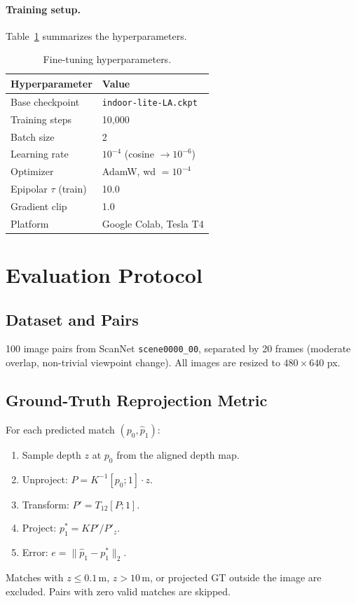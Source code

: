 \documentclass[10pt]{article}
\begin{document}
\paragraph{Training setup.} Table~\ref{tab:training} summarizes the hyperparameters.

\begin{table}[H]
\centering
\caption{Fine-tuning hyperparameters.}
\label{tab:training}
\small
\begin{tabular}{ll}
\toprule
\textbf{Hyperparameter} & \textbf{Value} \\
\midrule
Base checkpoint         & \texttt{indoor-lite-LA.ckpt} \\
Training steps          & 10,000 \\
Batch size              & 2 \\
Learning rate           & $10^{-4}$ (cosine $\to 10^{-6}$) \\
Optimizer               & AdamW, wd $= 10^{-4}$ \\
Epipolar $\tau$ (train) & 10.0 \\
Gradient clip           & 1.0 \\
Platform                & Google Colab, Tesla T4 \\
\bottomrule
\end{tabular}
\end{table}

\section{Evaluation Protocol}

\subsection{Dataset and Pairs}
100 image pairs from ScanNet \texttt{scene0000\_00}, separated by 20 frames (moderate overlap, non-trivial viewpoint change). All images are resized to $480 \times 640$ px.

\subsection{Ground-Truth Reprojection Metric}

For each predicted match $(p_0, \hat{p}_1)$:
\begin{enumerate}[leftmargin=*,itemsep=1pt]
    \item Sample depth $z$ at $p_0$ from the aligned depth map.
    \item Unproject: $P = K^{-1}[p_0; 1] \cdot z$.
    \item Transform: $P' = T_{12}[P; 1]$.
    \item Project: $p_1^* = K P' / P'_z$.
    \item Error: $e = \|\hat{p}_1 - p_1^*\|_2$.
\end{enumerate}
Matches with $z \leq 0.1$\,m, $z > 10$\,m, or projected GT outside the image are excluded. Pairs with zero valid matches are skipped.
\end{document}

